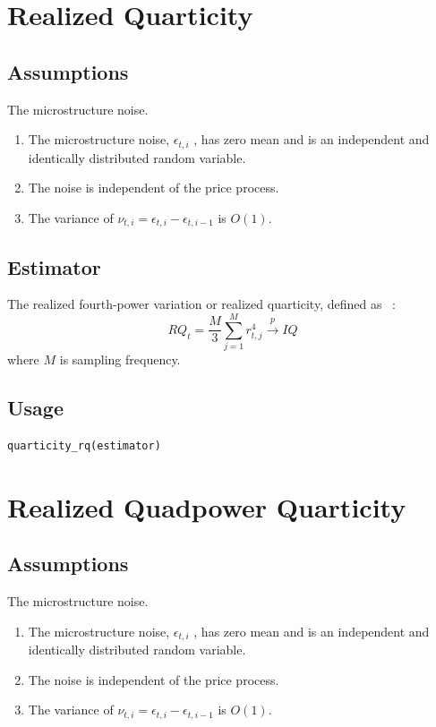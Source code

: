 \documentclass[letterpaper]{report}
\begin{document}
\section{Realized Quarticity}
\subsection{Assumptions}
The microstructure noise.
\begin{enumerate}
\item The microstructure noise, $\epsilon_{t,i}$ , has zero mean and is an
independent and identically distributed random variable.
\item The noise is independent of the price process.
\item The variance of $\nu_{t,i} = \epsilon_{t,i} - \epsilon_{t,i-1}$ is
$O(1)$.
\end{enumerate}
\subsection{Estimator}
The realized fourth-power variation or realized quarticity, defined as
~\cite[Corsi et al., 2005]{Corsi_Kretschmer_Mittnik_Pigorsch}:
\begin{equation}
\label{RQ}
RQ_t = \frac{M}{3} \sum_{j=1}^M r^4_{t,j} \stackrel{p}{\to} IQ
\end{equation}
where $M$ is sampling frequency.
  \subsection{Usage}
\begin{lstlisting}
quarticity_rq(estimator)
\end{lstlisting}
\thispagestyle{plain}
\section{Realized Quadpower Quarticity}
\subsection{Assumptions}
The microstructure noise.
\begin{enumerate}
\item The microstructure noise, $\epsilon_{t,i}$ , has zero mean and is an
independent and identically distributed random variable.
\item The noise is independent of the price process.
\item The variance of $\nu_{t,i} = \epsilon_{t,i} - \epsilon_{t,i-1}$ is
$O(1)$.
\end{enumerate}
\end{document}
